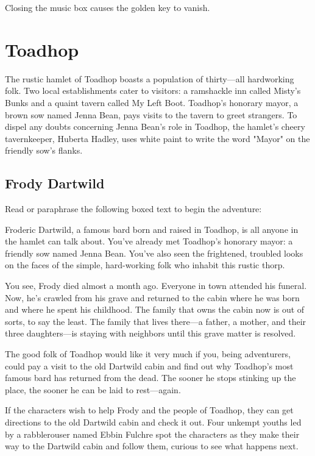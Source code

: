\documentclass[10pt,a4paper,twoside,bg=print,twocolumn,openany,nodeprecatedcode]{dndbook}
\begin{document}
Closing the music box causes the golden key to vanish.

\section{Toadhop}
The rustic hamlet of Toadhop boasts a population of thirty—all hardworking folk. Two local establishments cater to visitors: a ramshackle inn called Misty's Bunks and a quaint tavern called My Left Boot. Toadhop's honorary mayor, a brown sow named Jenna Bean, pays visits to the tavern to greet strangers. To dispel any doubts concerning Jenna Bean's role in Toadhop, the hamlet's cheery tavernkeeper, Huberta Hadley, uses white paint to write the word "Mayor" on the friendly sow's flanks.

\subsection{Frody Dartwild}
Read or paraphrase the following boxed text to begin the adventure:

\begin{DndReadAloud}{}
Froderic Dartwild, a famous bard born and raised in Toadhop, is all anyone in the hamlet can talk about. You've already met Toadhop's honorary mayor: a friendly sow named Jenna Bean. You've also seen the frightened, troubled looks on the faces of the simple, hard-working folk who inhabit this rustic thorp.

You see, Frody died almost a month ago. Everyone in town attended his funeral. Now, he's crawled from his grave and returned to the cabin where he was born and where he spent his childhood. The family that owns the cabin now is out of sorts, to say the least. The family that lives there—a father, a mother, and their three daughters—is staying with neighbors until this grave matter is resolved.

The good folk of Toadhop would like it very much if you, being adventurers, could pay a visit to the old Dartwild cabin and find out why Toadhop's most famous bard has returned from the dead. The sooner he stops stinking up the place, the sooner he can be laid to rest—again.

\end{DndReadAloud}

If the characters wish to help Frody and the people of Toadhop, they can get directions to the old Dartwild cabin and check it out. Four unkempt youths led by a rabblerouser named Ebbin Fulchre spot the characters as they make their way to the Dartwild cabin and follow them, curious to see what happens next.
\end{document}
